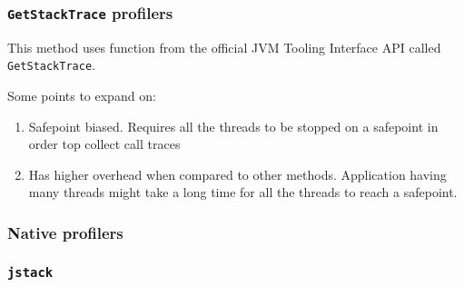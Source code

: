 \documentclass[..thesis.tex]{subfiles}
\begin{document}


\subsubsection{\texttt{GetStackTrace} profilers}
This method uses function from the official JVM Tooling Interface API \cite{jvmti_doc} called \texttt{GetStackTrace}.

Some points to expand on:
\begin{enumerate}
	\item Safepoint biased. Requires all the threads to be stopped on a safepoint in order top collect call traces
	\item Has higher overhead when compared to other methods. Application having many threads might take a long time for all the threads to reach a safepoint.
\end{enumerate}

\subsubsection{Native profilers}
\subsubsection{\texttt{jstack}}
\end{document}
